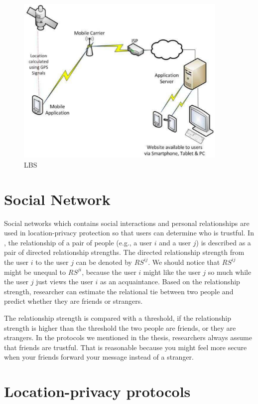 \begin{figure} [H]
  \centering 
  \includegraphics[width=4.0in]{figures/FIG_LBS_11.png}
  \caption{LBS \cite {C11}} 
  \label{fig:LBS} %
\end{figure}

\section{ Social Network}

\noindent Social networks which contains social interactions and personal relationships are used in location-privacy protection so that users can determine who is trustful. In \cite {C30}, the relationship of a pair of people (e.g., a user $i$ and a user $j$) is described as a pair of directed relationship strengths. The directed relationship strength from the user $i$ to the user $j$ can be denoted by ${RS}^{ij}$. We should notice that ${RS}^{ij}$ might be unequal to ${RS}^{ji}$, because the user $i$ might like the user $j$ so much while the user $j$ just views the user $i$ as an acquaintance. Based on the relationship strength, researcher can estimate the relational tie between two people and predict whether they are friends or strangers. 

The relationship strength is compared with a threshold, if the relationship strength is higher than the threshold the two people are friends, or they are strangers. In the protocols we mentioned in the thesis, researchers always assume that friends are trustful. That is reasonable because you might feel more secure when your friends forward your message instead of a stranger. 


\section{ Location-privacy protocols}

